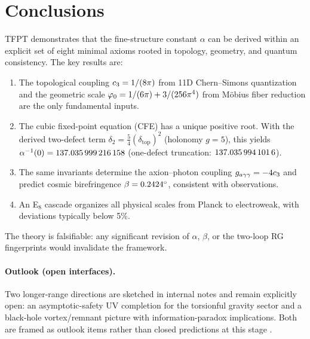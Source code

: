 \section{Conclusions}

TFPT demonstrates that the fine-structure constant $\alpha$ can be derived 
within an explicit set of eight minimal axioms rooted in topology, geometry, 
and quantum consistency. The key results are:

\begin{enumerate}
    \item The topological coupling $c_3 = 1/(8\pi)$ from 11D Chern--Simons 
        quantization and the geometric scale $\varphi_0 = 1/(6\pi) + 3/(256\pi^4)$ 
        from M\"obius fiber reduction are the only fundamental inputs.
    
    \item The cubic fixed-point equation (CFE) has a unique positive root. With the derived two-defect term $\delta_2=\frac54(\delta_{\mathrm{top}})^2$ (holonomy $g=5$), this yields
        $\alpha^{-1}(0)=\num[round-mode=places,round-precision=12]{\TFPTalphaInvGOverFourNum}$ (one-defect truncation: $\num[round-mode=places,round-precision=10]{\TFPTalphaInvSelfNum}$).
    
    \item The same invariants determine the axion--photon coupling 
        $g_{a\gamma\gamma} = -4c_3$ and predict cosmic birefringence 
        $\beta = \num[round-mode=places,round-precision=4]{\TFPTbetaDegNum}^\circ$, consistent with observations.
    
    \item An E$_8$ cascade organizes all physical scales from Planck to 
        electroweak, with deviations typically below 5\%.
\end{enumerate}

The theory is falsifiable: any significant revision of $\alpha$, $\beta$, 
or the two-loop RG fingerprints would invalidate the framework.

\paragraph{Outlook (open interfaces).}
Two longer-range directions are sketched in internal notes and remain explicitly open:
an asymptotic-safety UV completion for the torsionful gravity sector and a black-hole
vortex/remnant picture with information-paradox implications. Both are framed as outlook
items rather than closed predictions at this stage \cite{fiveProblemsNote2025,blackHolesBh1Note2025}.

